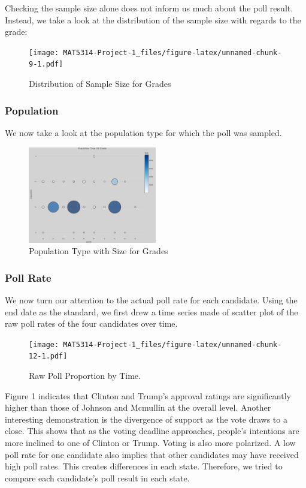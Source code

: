 \documentclass[
  12pt,
]{article}
\begin{document}
Checking the sample size alone does not inform us much about the poll
result. Instead, we take a look at the distribution of the sample size
with regards to the grade:

\begin{figure}
\centering
\texttt{[image: MAT5314-Project-1\_files/figure-latex/unnamed-chunk-9-1.pdf]}
\caption{Distribution of Sample Size for Grades}
\end{figure}

\hypertarget{population}{%
\subsubsection{Population}\label{population}}

We now take a look at the population type for which the poll was
sampled.

\begin{figure}
\centering
\includegraphics[width=0.5\textwidth,height=\textheight]{./Figures/popChart.png}
\caption{Population Type with Size for Grades}
\end{figure}

\hypertarget{poll-rate}{%
\subsubsection{Poll Rate}\label{poll-rate}}

We now turn our attention to the actual poll rate for each candidate.
Using the end date as the standard, we first drew a time series made of
scatter plot of the raw poll rates of the four candidates over time.

\begin{figure}
\centering
\texttt{[image: MAT5314-Project-1\_files/figure-latex/unnamed-chunk-12-1.pdf]}
\caption{Raw Poll Proportion by Time.}
\end{figure}

Figure 1 indicates that Clinton and Trump's approval ratings are
significantly higher than those of Johnson and Mcmullin at the overall
level. Another interesting demonstration is the divergence of support as
the vote draws to a close. This shows that as the voting deadline
approaches, people's intentions are more inclined to one of Clinton or
Trump. Voting is also more polarized. A low poll rate for one candidate
also implies that other candidates may have received high poll rates.
This creates differences in each state. Therefore, we tried to compare
each candidate's poll result in each state.
\end{document}

